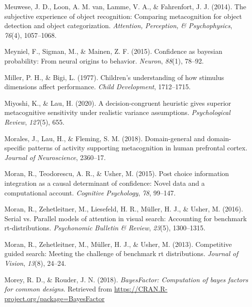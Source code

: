 \documentclass[12pt,twoside]{reedthesis}
\begin{document}
\leavevmode\hypertarget{ref-meuwese2014subjective}{}%
Meuwese, J. D., Loon, A. M. van, Lamme, V. A., \& Fahrenfort, J. J. (2014). The subjective experience of object recognition: Comparing metacognition for object detection and object categorization. \emph{Attention, Perception, \& Psychophysics}, \emph{76}(4), 1057--1068.

\leavevmode\hypertarget{ref-meyniel2015confidence}{}%
Meyniel, F., Sigman, M., \& Mainen, Z. F. (2015). Confidence as bayesian probability: From neural origins to behavior. \emph{Neuron}, \emph{88}(1), 78--92.

\leavevmode\hypertarget{ref-miller1977children}{}%
Miller, P. H., \& Bigi, L. (1977). Children's understanding of how stimulus dimensions affect performance. \emph{Child Development}, 1712--1715.

\leavevmode\hypertarget{ref-miyoshi2020decision}{}%
Miyoshi, K., \& Lau, H. (2020). A decision-congruent heuristic gives superior metacognitive sensitivity under realistic variance assumptions. \emph{Psychological Review}, \emph{127}(5), 655.

\leavevmode\hypertarget{ref-morales2018domain}{}%
Morales, J., Lau, H., \& Fleming, S. M. (2018). Domain-general and domain-specific patterns of activity supporting metacognition in human prefrontal cortex. \emph{Journal of Neuroscience}, 2360--17.

\leavevmode\hypertarget{ref-moran2015post}{}%
Moran, R., Teodorescu, A. R., \& Usher, M. (2015). Post choice information integration as a causal determinant of confidence: Novel data and a computational account. \emph{Cognitive Psychology}, \emph{78}, 99--147.

\leavevmode\hypertarget{ref-moran2016serial}{}%
Moran, R., Zehetleitner, M., Liesefeld, H. R., Müller, H. J., \& Usher, M. (2016). Serial vs. Parallel models of attention in visual search: Accounting for benchmark rt-distributions. \emph{Psychonomic Bulletin \& Review}, \emph{23}(5), 1300--1315.

\leavevmode\hypertarget{ref-moran2013competitive}{}%
Moran, R., Zehetleitner, M., Müller, H. J., \& Usher, M. (2013). Competitive guided search: Meeting the challenge of benchmark rt distributions. \emph{Journal of Vision}, \emph{13}(8), 24--24.

\leavevmode\hypertarget{ref-R-BayesFactor}{}%
Morey, R. D., \& Rouder, J. N. (2018). \emph{BayesFactor: Computation of bayes factors for common designs}. Retrieved from \url{https://CRAN.R-project.org/package=BayesFactor}
\end{document}
